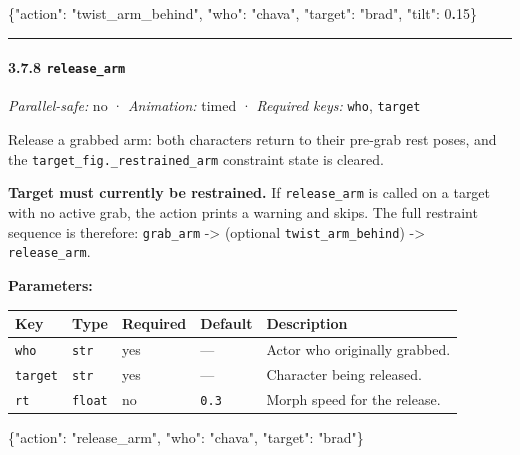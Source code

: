 \documentclass[
  12pt,
  letterpaper,
]{book}
\newenvironment{Shaded}{}{}
\newcommand{\DataTypeTok}[1]{\textcolor[rgb]{0.56,0.13,0.00}{#1}}
\newcommand{\DecValTok}[1]{\textcolor[rgb]{0.25,0.63,0.44}{#1}}
\newcommand{\ErrorTok}[1]{\textcolor[rgb]{1.00,0.00,0.00}{\textbf{#1}}}
\newcommand{\FunctionTok}[1]{\textcolor[rgb]{0.02,0.16,0.49}{#1}}
\newcommand{\StringTok}[1]{\textcolor[rgb]{0.25,0.44,0.63}{#1}}
\begin{document}
\begin{Shaded}
\begin{Highlighting}[]
\FunctionTok{\{}\DataTypeTok{"action"}\FunctionTok{:} \StringTok{"twist\_arm\_behind"}\FunctionTok{,} \DataTypeTok{"who"}\FunctionTok{:} \StringTok{"chava"}\FunctionTok{,} \DataTypeTok{"target"}\FunctionTok{:} \StringTok{"brad"}\FunctionTok{,} \DataTypeTok{"tilt"}\FunctionTok{:} \DecValTok{0}\ErrorTok{.}\DecValTok{15}\FunctionTok{\}}
\end{Highlighting}
\end{Shaded}

\begin{center}\rule{0.5\linewidth}{0.5pt}\end{center}

\paragraph{\texorpdfstring{3.7.8
\texttt{release\_arm}}{3.7.8 release\_arm}}\label{release_arm}

\emph{Parallel-safe:} no · \emph{Animation:} timed · \emph{Required
keys:} \texttt{who}, \texttt{target}

Release a grabbed arm: both characters return to their pre-grab rest
poses, and the \texttt{target\_fig.\_restrained\_arm} constraint state
is cleared.

\textbf{Target must currently be restrained.} If \texttt{release\_arm}
is called on a target with no active grab, the action prints a warning
and skips. The full restraint sequence is therefore: \texttt{grab\_arm}
-\textgreater{} (optional \texttt{twist\_arm\_behind}) -\textgreater{}
\texttt{release\_arm}.

\textbf{Parameters:}

\begin{longtable}[]{@{}lllll@{}}
\toprule\noalign{}
Key & Type & Required & Default & Description \\
\midrule\noalign{}
\endhead
\bottomrule\noalign{}
\endlastfoot
\texttt{who} & \texttt{str} & yes & --- & Actor who originally
grabbed. \\
\texttt{target} & \texttt{str} & yes & --- & Character being
released. \\
\texttt{rt} & \texttt{float} & no & \texttt{0.3} & Morph speed for the
release. \\
\end{longtable}

\begin{Shaded}
\begin{Highlighting}[]
\FunctionTok{\{}\DataTypeTok{"action"}\FunctionTok{:} \StringTok{"release\_arm"}\FunctionTok{,} \DataTypeTok{"who"}\FunctionTok{:} \StringTok{"chava"}\FunctionTok{,} \DataTypeTok{"target"}\FunctionTok{:} \StringTok{"brad"}\FunctionTok{\}}
\end{Highlighting}
\end{Shaded}
\end{document}
